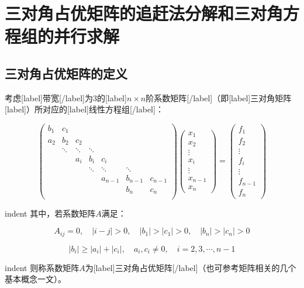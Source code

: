 \documentclass[UTF8,nofonts]{ctexart}
\begin{document}
\section*{三对角占优矩阵的追赶法分解和三对角方程组的并行求解}

\subsection*{三对角占优矩阵的定义}

考虑[label]带宽[/label]为$3$的[label]$n \times n$阶系数矩阵[/label]（即[label]三对角矩阵[label]）所对应的[label]线性方程组[/label]：

\begin{equation}
\label{eq:trimat}
\begin{pmatrix}
b_1 & c_1 & & & & & \\
a_2 & b_2 & c_2 & & & & \\
 & \ddots & \ddots & \ddots & & & \\
& & a_i & b_i & c_i & & \\
& & & \ddots & \ddots & \ddots & \\
& & & & a_{n-1} & b_{n-1} & c_{n-1} \\
& & & & & b_{n} & c_{n} \\
\end{pmatrix}
\begin{pmatrix}
x_1 \\ x_2 \\ \vdots \\ x_i \\ \vdots \\ x_{n-1} \\ x_n
\end{pmatrix}=
\begin{pmatrix}
f_1 \\ f_2 \\ \vdots \\ f_i \\ \vdots \\ f_{n-1} \\ f_n
\end{pmatrix}
\end{equation}

indent 其中，若系数矩阵$A$满足：

\[
A_{ij}=0,\quad|i-j|>0,\quad|b_1|>|c_1|>0,\quad|b_n|>|c_n|>0
\]

\[
|b_i|\geq|a_i|+|c_i|,\quad a_i,c_i \neq 0,\quad i=2,3,\cdots,n-1
\]

indent 则称系数矩阵$A$为[label]三对角占优矩阵[/label]（也可参考矩阵相关的几个基本概念一文）。
\end{document}
